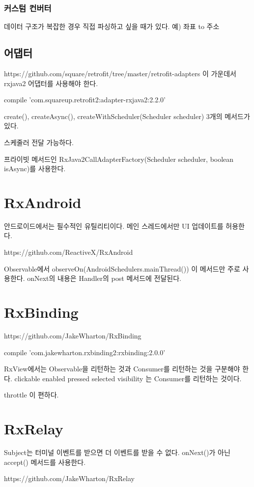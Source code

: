 \documentclass{book}
\begin{document}
{\subsubsection{커스텀 컨버터}
데이터 구조가 복잡한 경우 직접 파싱하고 싶을 때가 있다. 
예) 좌표 to 주소

\subsection{어댑터}
https://github.com/square/retrofit/tree/master/retrofit-adapters
이 가운데서 rxjava2 어댑터를 사용해야 한다.

compile 'com.squareup.retrofit2:adapter-rxjava2:2.2.0'

create(), createAsync(), createWithScheduler(Scheduler scheduler) 3개의 메서드가 있다.

스케줄러 전달 가능하다.

프라이빗 메서드인 RxJava2CallAdapterFactory(Scheduler scheduler, boolean isAsync)를 사용한다.



\section{RxAndroid}
안드로이드에서는 필수적인 유틸리티이다. 메인 스레드에서만 UI 업데이트를 허용한다.

https://github.com/ReactiveX/RxAndroid

Observable에서 observeOn(AndroidSchedulers.mainThread()) 이 메서드만 주로 사용한다.
onNext의 내용은 Handler의 post 메서드에 전달된다.

\section{RxBinding}
https://github.com/JakeWharton/RxBinding

compile 'com.jakewharton.rxbinding2:rxbinding:2.0.0'

RxView에서는 Observable을 리턴하는 것과 Consumer를 리턴하는 것을 구분해야 한다.
clickable
enabled
pressed
selected
visibility
는 Consumer를 리턴하는 것이다.

throttle 이 편하다.

\section{RxRelay}
Subject는 터미널 이벤트를 받으면 더 이벤트를 받을 수 없다.
onNext()가 아닌 accept() 메서드를 사용한다.

https://github.com/JakeWharton/RxRelay


}
\end{document}
